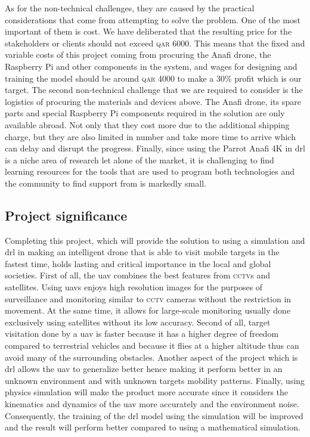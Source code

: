 \documentclass[../main.tex]{subfiles}
\begin{document}
As for the non-technical challenges, they are caused
by the practical considerations that come
from attempting to solve the problem.
One of the most important of them is cost. 
We have deliberated that
the resulting price for the stakeholders or clients
should not exceed \textsc{qar} 6000. 
This means that the fixed and variable costs of this project
coming from procuring the Anafi drone, the Raspberry Pi and other
components in the system, 
and wages for designing and training the model
should be around \textsc{qar} 4000 to make a 30\% profit 
which is our target.
The second non-technical challenge that we are required to consider
is the logistics of procuring the materials and devices above.
The Anafi drone, its spare parts and special Raspberry Pi
components required in the solution are only available abroad.
Not only that they cost more due to the additional shipping charge,
but they are also limited in number 
and take more time to arrive which can delay 
and disrupt the progress.
Finally, since using the Parrot Anafi 4K in \gls{drl}
is a niche area of research let alone of the market,
it is challenging to find learning resources for the tools
that are used to program both technologies
and the community to find support from is markedly small.


\subsection{Project significance}

Completing this project, which will provide the solution
to using a simulation and \gls{drl} in making an intelligent drone 
that is able to visit mobile targets in the fastest time,
holds lasting and critical importance 
in the local and global societies.
First of all, the \gls{uav} combines the best features
from \textsc{cctv}s and satellites.
Using \glspl{uav} enjoys high resolution images
for the purposes of surveillance and monitoring
similar to \textsc{cctv} cameras without the restriction in movement.
At the same time, it allows for large-scale monitoring 
usually done exclusively using satellites without its low accuracy.
Second of all, target visitation done by a \gls{uav}
is faster because it has a higher degree of freedom
compared to terrestrial vehicles and because
it flies at a higher altitude thus can avoid 
many of the surrounding obstacles.
Another aspect of the project which is \gls{drl} 
allows the \gls{uav} to generalize better
hence making it perform better in an unknown environment
and with unknown targets mobility patterns.
Finally, using physics simulation will make the product 
more accurate since it considers 
the kinematics and dynamics of the \gls{uav} more accurately
and the environment noise.
Consequently, the training of the \gls{drl} model 
using the simulation will be improved 
and the result will perform better
compared to using a mathematical simulation.
\end{document}
